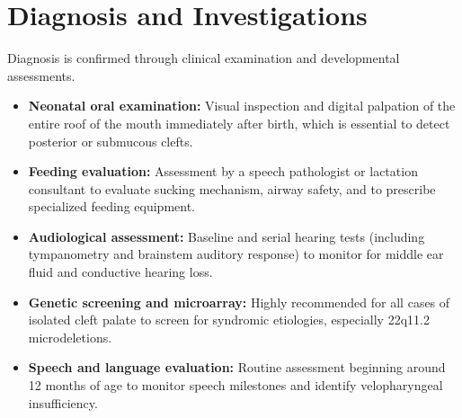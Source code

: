 \section*{Diagnosis and Investigations}
Diagnosis is confirmed through clinical examination and developmental assessments.
\begin{itemize}
    \item \textbf{Neonatal oral examination:} Visual inspection and digital palpation of the entire roof of the mouth immediately after birth, which is essential to detect posterior or submucous clefts.
    \item \textbf{Feeding evaluation:} Assessment by a speech pathologist or lactation consultant to evaluate sucking mechanism, airway safety, and to prescribe specialized feeding equipment.
    \item \textbf{Audiological assessment:} Baseline and serial hearing tests (including tympanometry and brainstem auditory response) to monitor for middle ear fluid and conductive hearing loss.
    \item \textbf{Genetic screening and microarray:} Highly recommended for all cases of isolated cleft palate to screen for syndromic etiologies, especially 22q11.2 microdeletions.
    \item \textbf{Speech and language evaluation:} Routine assessment beginning around 12 months of age to monitor speech milestones and identify velopharyngeal insufficiency.
\end{itemize}

